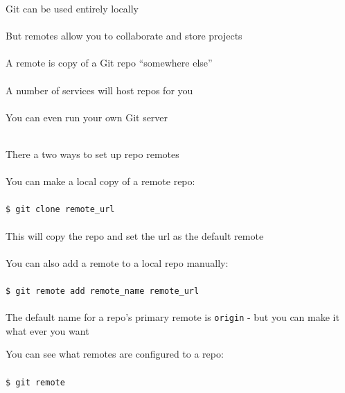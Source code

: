 \documentclass{beamer}
\begin{document}
\begin{frame}[allowframebreaks]{\secname}
    Git can be used entirely locally\\~\\

    But remotes allow you to collaborate and store projects\\~\\

    A remote is copy of a Git repo ``somewhere else''\\~\\

    A number of services will host repos for you\\~\\

    You can even run your own Git server\\~\\

\framebreak

    There a two ways to set up repo remotes \\~\\

    You can make a local copy of a remote repo: \\~\\

    {\tt \$ git clone remote\_url} \\~\\

    This will copy the  repo and set the url as the default remote
    \\~\\

    You can also add a remote to a local repo manually: \\~\\

    {\tt \$ git remote add remote\_name remote\_url} \\~\\

    The default name for a repo's primary remote is {\tt origin} - but you can
    make it what ever you want

\framebreak
    
    You can see what remotes are configured to a repo: \\~\\

    {\tt \$ git remote} \\~\\


\end{frame}
\end{document}
